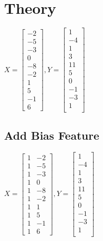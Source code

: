 \documentclass[12pt]{article}
\begin{document}
\maketitle


\section{Theory}
$X =
\begin{bmatrix}
	-2\\
	-5\\
	-3\\
	0\\
	-8\\
	-2\\
	1\\
	5\\
	-1\\
	6
\end{bmatrix},
Y = 
\begin{bmatrix}
	1\\
	-4\\	
	1\\
	3\\
	11\\
	5\\
	0\\
	-1\\
	-3\\
	1\\
\end{bmatrix}
$

\subsection{Add Bias Feature}\label{bias}
$X =
\begin{bmatrix}
	1 & -2\\
	1 & -5\\
	1 & -3\\
	1 & 0\\
	1 & -8\\
	1 & -2\\
	1 & 1\\
	1 & 5\\
	1 & -1\\
	1 & 6
\end{bmatrix},
Y = 
\begin{bmatrix}
	1\\
	-4\\	
	1\\
	3\\
	11\\
	5\\
	0\\
	-1\\
	-3\\
	1\\
\end{bmatrix}
$
\end{document}
